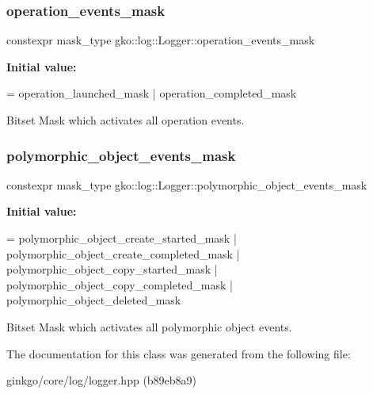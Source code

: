 \mbox{\label{classgko_1_1log_1_1Logger_a179f3d3ac86782922cbc63e33272840a}} 
\subsubsection{\texorpdfstring{operation\+\_\+events\+\_\+mask}{operation\_events\_mask}}
{\footnotesize\ttfamily constexpr mask\+\_\+type gko\+::log\+::\+Logger\+::operation\+\_\+events\+\_\+mask\hspace{0.3cm}{\ttfamily [static]}}

{\bfseries Initial value\+:}
\begin{DoxyCode}
=
        operation\_launched\_mask | operation\_completed\_mask
\end{DoxyCode}


Bitset Mask which activates all operation events. 

\mbox{\label{classgko_1_1log_1_1Logger_a5fb997f1c06c0602103d8dab616a96bc}} 
\subsubsection{\texorpdfstring{polymorphic\+\_\+object\+\_\+events\+\_\+mask}{polymorphic\_object\_events\_mask}}
{\footnotesize\ttfamily constexpr mask\+\_\+type gko\+::log\+::\+Logger\+::polymorphic\+\_\+object\+\_\+events\+\_\+mask\hspace{0.3cm}{\ttfamily [static]}}

{\bfseries Initial value\+:}
\begin{DoxyCode}
=
        polymorphic\_object\_create\_started\_mask |
        polymorphic\_object\_create\_completed\_mask |
        polymorphic\_object\_copy\_started\_mask |
        polymorphic\_object\_copy\_completed\_mask |
        polymorphic\_object\_deleted\_mask
\end{DoxyCode}


Bitset Mask which activates all polymorphic object events. 



The documentation for this class was generated from the following file\+:\begin{DoxyCompactItemize}
\item 
ginkgo/core/log/logger.\+hpp (b89eb8a9)\end{DoxyCompactItemize}
